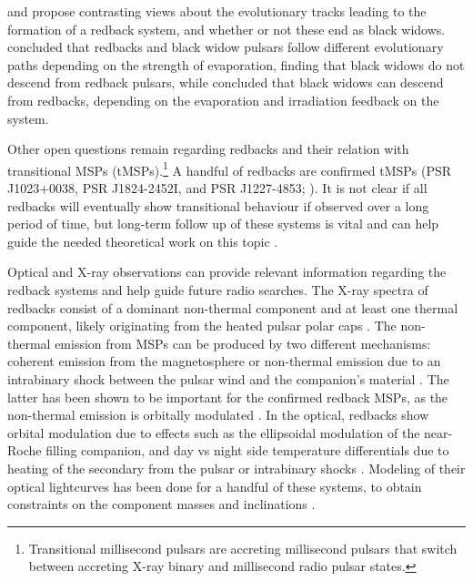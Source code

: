 \documentclass[fleqn,usenatbib,useAMS,letters]{mnras}
\begin{document}
\cite{ChenFormationRedback2013} and \cite{Benvenuto2014} propose contrasting views about the evolutionary tracks leading to the formation of a redback system, and whether or not these end as black widows. %
\cite{ChenFormationRedback2013} concluded that redbacks and  black  widow  pulsars  follow  different  evolutionary  paths depending  on  the  strength  of  evaporation,  finding  that  black widows  do  not  descend  from  redback  pulsars, while \cite{Benvenuto2014} concluded that black widows can descend from redbacks, depending on the evaporation  and  irradiation  feedback on the system. 

Other open questions remain regarding redbacks and their relation with transitional MSPs (tMSPs).\footnote{Transitional millisecond pulsars are accreting millisecond pulsars that switch between accreting X-ray binary and millisecond radio pulsar states.} A handful of %
redbacks are 
 confirmed tMSPs (PSR J1023+0038, PSR J1824-2452I, and PSR J1227-4853;  \citealt{Archibal09,Papitto13,bassa2014change}).  It is not clear if all redbacks will eventually show transitional behaviour if observed over a long period of time, but long-term follow up of these systems is vital and can help guide the needed theoretical work on this topic
.


Optical and X-ray observations can provide relevant information regarding the redback systems and help guide future radio searches. The X-ray spectra of redbacks consist of a dominant non-thermal component and at least one thermal component, likely originating from the heated pulsar polar caps \citep{Zavlin96,Zavlin02,Bogdanov05,Bogdanov2011Pulsar}. The non-thermal emission from MSPs can be produced by two different mechanisms: coherent emission from the magnetosphere or non-thermal emission due to an intrabinary shock between the pulsar wind and the companion's material \citep{2003SciStapper}. The latter has been shown to be important for the confirmed redback MSPs, as the non-thermal emission is orbitally modulated \citep{Bogdanov05,bogdanov_chandra_2010,Bogdanov2011Pulsar}. In the optical, redbacks show orbital modulation due to effects such as the ellipsoidal modulation of the near-Roche filling companion, and day vs night side temperature differentials due to heating of the secondary from the pulsar or intrabinary shocks \cite[e.g.][]{Callanan95,Romani16,Cho2018}. Modeling of their optical lightcurves has been done for a handful of these systems, to obtain constraints on the component masses and  inclinations \citep{Thorstensen2005,Cho2018,Strader2019Redbacks}.
\end{document}
